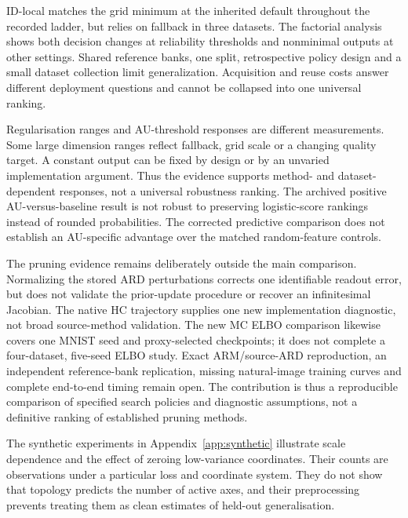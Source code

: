 \documentclass[make,article,submit,pdftex,moreauthors]{Definitions/mdpi}
\begin{document}
ID-local matches the grid minimum at the inherited default throughout the
recorded ladder, but relies on fallback in three datasets. The factorial
analysis shows both decision changes at reliability thresholds and
nonminimal outputs at other settings. Shared reference banks, one split,
retrospective policy design and a small dataset collection limit
generalization. Acquisition and reuse costs answer different deployment
questions and cannot be collapsed into one universal ranking.

Regularisation ranges and AU-threshold responses are different
measurements. Some large dimension ranges reflect fallback, grid scale
or a changing quality target. A constant output can be fixed by design
or by an unvaried implementation argument. Thus the evidence supports
method- and dataset-dependent responses, not a universal robustness
ranking. The archived positive AU-versus-baseline result is not robust
to preserving logistic-score rankings instead of rounded probabilities.
The corrected predictive comparison does not establish an AU-specific
advantage over the matched random-feature controls.

The pruning evidence remains deliberately outside the main comparison.
Normalizing the stored ARD perturbations corrects one identifiable
readout error, but does not validate the prior-update procedure or
recover an infinitesimal Jacobian. The native HC trajectory supplies
one new implementation diagnostic, not broad source-method validation.
The new MC ELBO comparison likewise covers one MNIST seed and
proxy-selected checkpoints; it does not complete a four-dataset,
five-seed ELBO study. Exact ARM/source-ARD reproduction, an independent
reference-bank replication, missing natural-image training curves and
complete end-to-end timing remain open. The contribution is thus a
reproducible comparison of specified search policies and diagnostic
assumptions, not a definitive ranking of established pruning methods.

The synthetic experiments in Appendix~\ref{app:synthetic} illustrate
scale dependence and the effect of zeroing low-variance coordinates.
Their counts are observations under a particular loss and coordinate
system. They do not show that topology predicts the number of active
axes, and their preprocessing prevents treating them as clean estimates
of held-out generalisation.
\end{document}
